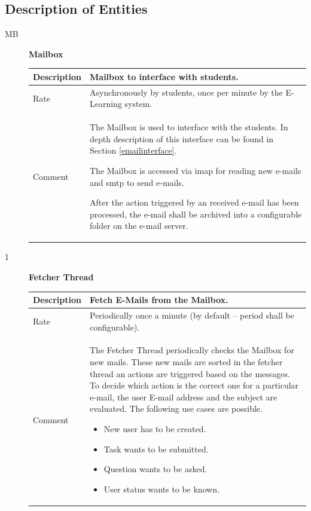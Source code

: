 \subsection{Description of Entities}
\begin{description}
    \item [MB] \textbf{Mailbox} \\
    \begin{tabular}{|p{2cm}|p{11cm}|}
        \hline
        Description & Mailbox to interface with students. \\
        \hline
        Rate & Asynchronously by students, once per minute by the E-Learning system. \\
        \hline

        Comment & The Mailbox is used to interface with the students. In depth description of this 
        interface can be found in Section \ref{emailinterface}.
        
        The Mailbox is accessed via \gls{imap} for reading new e-mails and \gls{smtp} to send e-mails.

        After the action triggered by an received e-mail has been processed, the e-mail shall be archived 
        into a configurable folder on the e-mail server.
        \\
        \hline
    \end{tabular}
    \item [1] \textbf{Fetcher Thread} \\
    \begin{tabular}{|p{2cm}|p{11cm}|}
        \hline
        Description &  Fetch E-Mails from the Mailbox.\\
        \hline
        Rate & Periodically once a minute (by default -- period shall be configurable). \\
        \hline

        Comment & The Fetcher Thread periodically checks the Mailbox for new mails. These new
        mails are sorted in the fetcher thread an actions are triggered based on the messages.
        To decide which action is the correct one for a particular e-mail, the user E-mail 
        address and the subject are evaluated. The following use cases are possible.
        \begin{itemize}
        \item New user has to be created.
        \item Task wants to be submitted.
        \item Question wants to be asked.
        \item User status wants to be known.
        \end{itemize}
    

\end{tabular}
\end{description}
